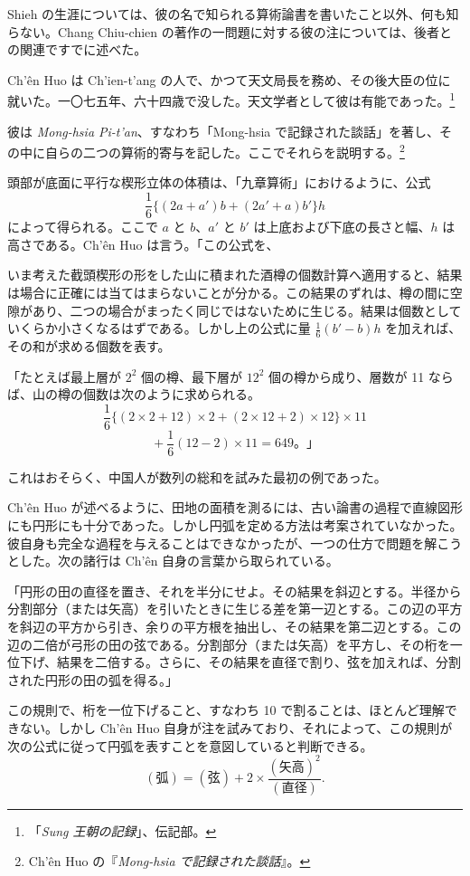 \documentclass[11pt]{article}
\newcommand{\scanpage}[2]{\clearpage\setcounter{footnote}{0}\noindent{\footnotesize\color{gray}PDF #1 頁 · #2}\par\medskip}
\newcommand{\scanfooter}{}
\begin{document}
Shieh の生涯については、彼の名で知られる算術論書を書いたこと以外、何も知らない。Chang Chiu-chien の著作の一問題に対する彼の注については、後者との関連ですでに述べた。

Ch'ên Huo は Ch'ien-t'ang の人で、かつて天文局長を務め、その後大臣の位に就いた。一〇七五年、六十四歳で没した。天文学者として彼は有能であった。\footnote{「\emph{Sung 王朝の記録}」、伝記部。}

彼は \emph{Mong-hsia Pi-t'an}、すなわち「Mong-hsia で記録された談話」を著し、その中に自らの二つの算術的寄与を記した。ここでそれらを説明する。\footnote{Ch'ên Huo の『\emph{Mong-hsia で記録された談話}』。}

頭部が底面に平行な楔形立体の体積は、「九章算術」におけるように、公式
\[
\frac{1}{6}\{(2a+a')b+(2a'+a)b'\}h
\]
によって得られる。ここで $a$ と $b$、$a'$ と $b'$ は上底および下底の長さと幅、$h$ は高さである。Ch'ên Huo は言う。「この公式を、
\scanfooter

\scanpage{0076}{第10章、印刷頁62}
いま考えた截頭楔形の形をした山に積まれた酒樽の個数計算へ適用すると、結果は場合に正確には当てはまらないことが分かる。この結果のずれは、樽の間に空隙があり、二つの場合がまったく同じではないために生じる。結果は個数としていくらか小さくなるはずである。しかし上の公式に量 $\frac{1}{6}(b'-b)h$ を加えれば、その和が求める個数を表す。

「たとえば最上層が $2^2$ 個の樽、最下層が $12^2$ 個の樽から成り、層数が 11 ならば、山の樽の個数は次のように求められる。
\[
\frac{1}{6}\{(2\times2+12)\times2+(2\times12+2)\times12\}\times11
\]
\[
{}+\frac{1}{6}(12-2)\times11=649。」
\]

これはおそらく、中国人が数列の総和を試みた最初の例であった。

Ch'ên Huo が述べるように、田地の面積を測るには、古い論書の過程で直線図形にも円形にも十分であった。しかし円弧を定める方法は考案されていなかった。彼自身も完全な過程を与えることはできなかったが、一つの仕方で問題を解こうとした。次の諸行は Ch'ên 自身の言葉から取られている。

「円形の田の直径を置き、それを半分にせよ。その結果を斜辺とする。半径から分割部分（または矢高）を引いたときに生じる差を第一辺とする。この辺の平方を斜辺の平方から引き、余りの平方根を抽出し、その結果を第二辺とする。この辺の二倍が弓形の田の弦である。分割部分（または矢高）を平方し、その桁を一位下げ、結果を二倍する。さらに、その結果を直径で割り、弦を加えれば、分割された円形の田の弧を得る。」

この規則で、桁を一位下げること、すなわち 10 で割ることは、ほとんど理解できない。しかし Ch'ên Huo 自身が注を試みており、それによって、この規則が次の公式に従って円弧を表すことを意図していると判断できる。
\[
(\text{弧})=(\text{弦})+2\times\frac{(\text{矢高})^2}{(\text{直径})}.
\]
\scanfooter
\end{document}
